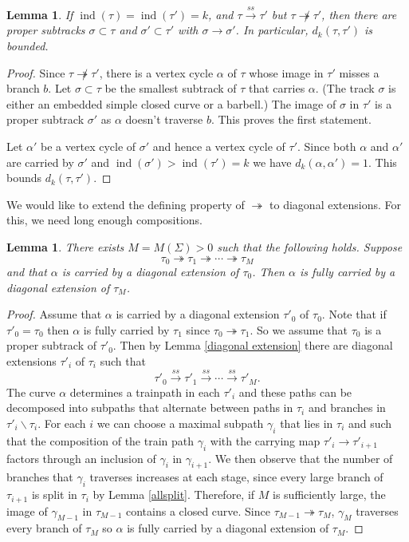 \documentclass[11pt]{article}
\newtheorem{lemma}[thm]{Lemma}
\theoremstyle{remark}
\def\ind{\operatorname{ind}}
\def\ss{{\overset{ss}\longrightarrow}}
\begin{document}
\begin{lemma}\label{nodouble}
If $\ind(\tau) = \ind(\tau') = k$, and $\tau\ss\tau'$ but $\tau\not\twoheadrightarrow\tau'$, then there are proper subtracks $\sigma \subset \tau$ and $\sigma' \subset \tau'$ with $\sigma \to \sigma'$. In particular, $d_k(\tau,\tau')$ is bounded.
\end{lemma}
\begin{proof}
Since $\tau\not\twoheadrightarrow\tau'$, there is a vertex cycle $\alpha$ of $\tau$ whose image in $\tau'$ misses a branch $b$. Let $\sigma \subset \tau$ be the smallest subtrack of $\tau$ that carries $\alpha$. (The track $\sigma$ is either an embedded simple closed curve or a barbell.) The image of $\sigma$ in $\tau'$ is a proper subtrack $\sigma'$ as $\alpha$ doesn't traverse $b$. This proves the first statement.

Let $\alpha'$ be a vertex cycle of $\sigma'$ and hence a vertex cycle of $\tau'$. Since both $\alpha$ and $\alpha'$ are carried by $\sigma'$ and $\ind(\sigma') > \ind(\tau') = k$ we have $d_k(\alpha, \alpha') = 1$.
This bounds $d_k(\tau, \tau')$.
\end{proof}

We would like to extend the defining property of $\twoheadrightarrow$
to diagonal extensions. For this, we need long enough compositions.

\begin{lemma}\label{extension carry}
There exists $M = M(\Sigma)>0$ such that the following holds. Suppose
$$\tau_0 \twoheadrightarrow \tau_1 \twoheadrightarrow \cdots \twoheadrightarrow \tau_M$$
and that $\alpha$ is carried by a diagonal extension of $\tau_0$. Then $\alpha$ is fully carried by a diagonal extension of $\tau_M$.
\end{lemma}

\begin{proof}
Assume that $\alpha$ is carried by a diagonal extension $\tau'_0$ of $\tau_0$. Note that if $\tau'_0 = \tau_0$ then $\alpha$ is fully carried by $\tau_1$ since $\tau_0\twoheadrightarrow\tau_1$. So we assume that $\tau_0$ is a proper subtrack of $\tau'_0$.
 Then by Lemma \ref{diagonal extension} there are diagonal extensions $\tau'_i$ of $\tau_i$ such that
$$\tau'_0\ss \tau'_1 \ss \cdots \ss \tau'_M.$$
The curve $\alpha$ determines a trainpath in each $\tau'_i$ and these
paths can be decomposed into subpaths that alternate between paths in
$\tau_i$ and branches in $\tau'_i \smallsetminus \tau_i$. For each $i$
we can choose a maximal subpath $\gamma_i$ that lies in $\tau_i$ and such that the composition of the train path $\gamma_i$ with the carrying map $\tau'_i \to \tau'_{i+1}$ factors through an inclusion of $\gamma_i$ in $\gamma_{i+1}$. We then observe that the number of branches that $\gamma_i$ traverses increases at each stage, since every large branch of $\tau_{i+1}$ is split in $\tau_i$ by Lemma \ref{allsplit}. Therefore, if $M$ is sufficiently large, the image of $\gamma_{M-1}$ in $\tau_{M-1}$ contains a closed curve. Since $\tau_{M-1}\twoheadrightarrow \tau_M$, $\gamma_M$ traverses every branch of $\tau_M$ so $\alpha$ is fully carried by a diagonal extension of $\tau_M$.
\end{proof}
\end{document}

